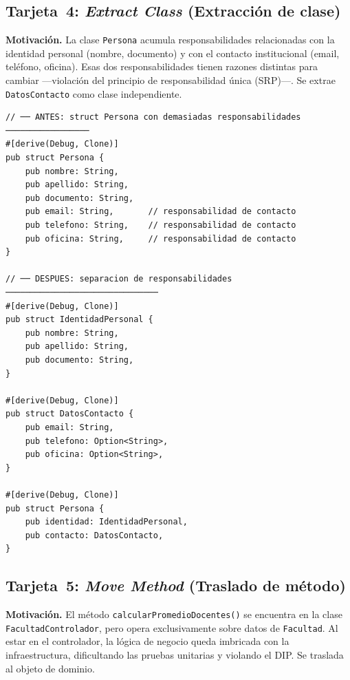 \subsection{Tarjeta~4: \textit{Extract Class} (Extracción de clase)}
\label{subsec:refact-extract-class}

\textbf{Motivación.} La clase \texttt{Persona} acumula responsabilidades relacionadas con
la identidad personal (nombre, documento) y con el contacto institucional (email, teléfono,
oficina). Esas dos responsabilidades tienen razones distintas para cambiar ---violación del
principio de responsabilidad única (SRP)---. Se extrae \texttt{DatosContacto} como clase
independiente.

\begin{lstlisting}[style=rustStyle,
  caption={\textit{Extract Class} en \rust: separación de \texttt{DatosContacto}.},
  label={lst:refact-extract-class-rust}]
// ── ANTES: struct Persona con demasiadas responsabilidades ─────────────────
#[derive(Debug, Clone)]
pub struct Persona {
    pub nombre: String,
    pub apellido: String,
    pub documento: String,
    pub email: String,       // responsabilidad de contacto
    pub telefono: String,    // responsabilidad de contacto
    pub oficina: String,     // responsabilidad de contacto
}

// ── DESPUES: separacion de responsabilidades ───────────────────────────────
#[derive(Debug, Clone)]
pub struct IdentidadPersonal {
    pub nombre: String,
    pub apellido: String,
    pub documento: String,
}

#[derive(Debug, Clone)]
pub struct DatosContacto {
    pub email: String,
    pub telefono: Option<String>,
    pub oficina: Option<String>,
}

#[derive(Debug, Clone)]
pub struct Persona {
    pub identidad: IdentidadPersonal,
    pub contacto: DatosContacto,
}
\end{lstlisting}

\subsection{Tarjeta~5: \textit{Move Method} (Traslado de método)}
\label{subsec:refact-move-method}

\textbf{Motivación.} El método \texttt{calcularPromedioDocentes()} se encuentra en la clase
\texttt{FacultadControlador}, pero opera exclusivamente sobre datos de \texttt{Facultad}.
Al estar en el controlador, la lógica de negocio queda imbricada con la infraestructura,
dificultando las pruebas unitarias y violando el DIP. Se traslada al objeto de dominio.

